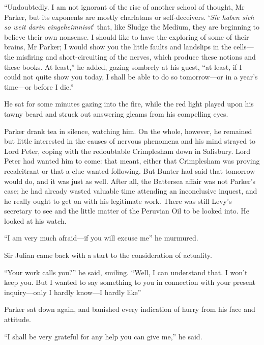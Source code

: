 \enquote{Undoubtedly. I am not ignorant of the rise of another school of thought, Mr Parker, but its exponents are mostly charlatans or self-deceivers. \enquote{\textit{Sie haben sich so weit darin eingeheimnisst}} that, like Sludge the Medium, they are beginning to believe their own nonsense. I should like to have the exploring of some of their brains, Mr Parker; I would show you the little faults and landslips in the cells\allowbreak---\allowbreak the misfiring and short-circuiting of the nerves, which produce these notions and these books. At least,} he added, gazing sombrely at his guest, \enquote{at least, if I could not quite show you today, I shall be able to do so tomorrow\allowbreak---\allowbreak or in a year’s time\allowbreak---\allowbreak or before I die.}

He sat for some minutes gazing into the fire, while the red light played upon his tawny beard and struck out answering gleams from his compelling eyes.

Parker drank tea in silence, watching him. On the whole, however, he remained but little interested in the causes of nervous phenomena and his mind strayed to Lord Peter, coping with the redoubtable Crimplesham down in Salisbury. Lord Peter had wanted him to come: that meant, either that Crimplesham was proving recalcitrant or that a clue wanted following. But Bunter had said that tomorrow would do, and it was just as well. After all, the Battersea affair was not Parker’s case; he had already wasted valuable time attending an inconclusive inquest, and he really ought to get on with his legitimate work. There was still Levy’s secretary to see and the little matter of the Peruvian Oil to be looked into. He looked at his watch.

\enquote{I am very much afraid\allowbreak---\allowbreak if you will excuse me\longdash} he murmured.

Sir Julian came back with a start to the consideration of actuality.

\enquote{Your work calls you?} he said, smiling. \enquote{Well, I can understand that. I won’t keep you. But I wanted to say something to you in connection with your present inquiry\allowbreak---\allowbreak only I hardly know\allowbreak---\allowbreak I hardly like\longdash}

Parker sat down again, and banished every indication of hurry from his face and attitude.

\enquote{I shall be very grateful for any help you can give me,} he said.

